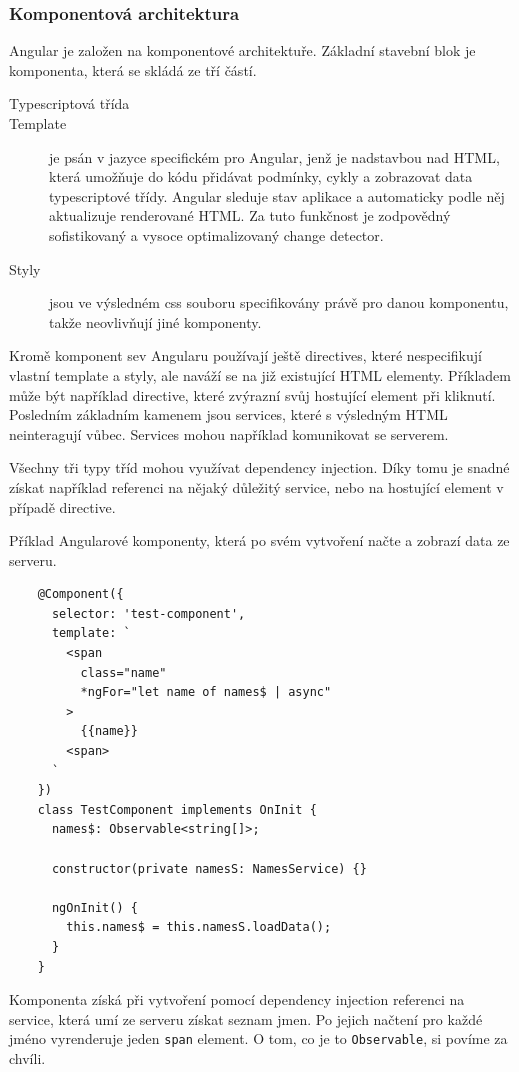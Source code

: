 \subsubsection*{Komponentová architektura}

Angular je založen na komponentové architektuře. Základní stavební blok je komponenta, která se skládá ze tří částí.

\begin{description}
  \item[Typescriptová třída]
  \item[Template] je psán v jazyce specifickém pro Angular, jenž je nadstavbou nad HTML, která umožňuje do kódu přidávat podmínky, cykly a zobrazovat data typescriptové třídy. Angular sleduje stav aplikace a automaticky podle něj aktualizuje renderované HTML. Za tuto funkčnost je zodpovědný sofistikovaný a vysoce optimalizovaný change detector.
  \item[Styly] jsou ve výsledném css souboru specifikovány právě pro danou komponentu, takže neovlivňují jiné komponenty.
\end{description}

Kromě komponent sev Angularu používají ještě directives, které nespecifikují vlastní template a styly, ale naváží se na již existující HTML elementy. Příkladem může být například directive, které zvýrazní svůj hostující element při kliknutí. Posledním základním kamenem jsou services, které s výsledným HTML neinteragují vůbec. Services mohou například komunikovat se serverem.

Všechny tři typy tříd mohou využívat dependency injection. Díky tomu je snadné získat například referenci na nějaký důležitý service, nebo na hostující element v případě directive.

\begin{exmp}
  Příklad Angularové komponenty, která po svém vytvoření načte a zobrazí data ze serveru.

  \begin{lstlisting}
    @Component({
      selector: 'test-component',
      template: `
        <span
          class="name"
          *ngFor="let name of names$ | async"
        >
          {{name}}
        <span>
      `
    })
    class TestComponent implements OnInit {
      names$: Observable<string[]>;

      constructor(private namesS: NamesService) {}

      ngOnInit() {
        this.names$ = this.namesS.loadData();
      }
    }
  \end{lstlisting}

  Komponenta získá při vytvoření pomocí dependency injection referenci na service, která umí ze serveru získat seznam jmen. Po jejich načtení pro každé jméno vyrenderuje jeden \lstinline|span| element. O tom, co je to \lstinline|Observable|, si povíme za chvíli.
\end{exmp}


